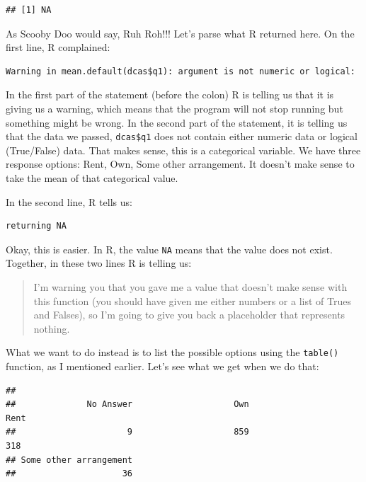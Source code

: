 \documentclass[]{article}
\newenvironment{Shaded}{\begin{snugshade}}{\end{snugshade}}
\newcommand{\KeywordTok}[1]{\textcolor[rgb]{0.13,0.29,0.53}{\textbf{{#1}}}}
\newcommand{\NormalTok}[1]{{#1}}
\begin{document}
\begin{verbatim}
## [1] NA
\end{verbatim}

As Scooby Doo would say, Ruh Roh!!! Let's parse what R returned here. On
the first line, R complained:

\begin{verbatim}
Warning in mean.default(dcas$q1): argument is not numeric or logical:
\end{verbatim}

In the first part of the statement (before the colon) R is telling us
that it is giving us a warning, which means that the program will not
stop running but something might be wrong. In the second part of the
statement, it is telling us that the data we passed, \texttt{dcas\$q1}
does not contain either numeric data or logical (True/False) data. That
makes sense, this is a categorical variable. We have three response
options: Rent, Own, Some other arrangement. It doesn't make sense to
take the mean of that categorical value.

In the second line, R tells us:

\begin{verbatim}
returning NA
\end{verbatim}

Okay, this is easier. In R, the value \texttt{NA} means that the value
does not exist. Together, in these two lines R is telling us:

\begin{quote}
I'm warning you that you gave me a value that doesn't make sense with
this function (you should have given me either numbers or a list of
Trues and Falses), so I'm going to give you back a placeholder that
represents nothing.
\end{quote}

What we want to do instead is to list the possible options using the
\texttt{table()} function, as I mentioned earlier. Let's see what we get
when we do that:

\begin{Shaded}
\end{Shaded}

\begin{verbatim}
## 
##              No Answer                    Own                   Rent 
##                      9                    859                    318 
## Some other arrangement 
##                     36
\end{verbatim}
\end{document}
